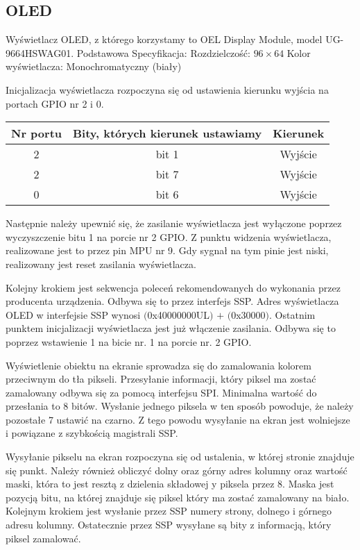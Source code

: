 \documentclass{classrep}
\begin{document}
		\subsection{OLED}
		Wyświetlacz OLED, z którego korzystamy to OEL Display Module, model UG-9664HSWAG01. 
		Podstawowa Specyfikacja:
		\newline \textendash Rozdzielczość:  $96\times 64$
		\newline \textendash Kolor wyświetlacza: Monochromatyczny (biały)
		
		Inicjalizacja wyświetlacza rozpoczyna się od ustawienia kierunku wyjścia na portach GPIO nr 2 i 0.
		
		
		 \begin{tabular}{|c|c|c|}
		 	\hline 
		 	\textbf{Nr portu} & \textbf{Bity, których kierunek ustawiamy} & \textbf{Kierunek}  \\ 
		 	\hline 
		 	2 & bit 1 & Wyjście \\ 
		 	\hline 
		 	2 & bit 7 & Wyjście  \\ 
		 	\hline 
		 	0 & bit 6 & Wyjście \\
		 	\hline
		 	 \end{tabular} 
		 	
		 	Następnie należy upewnić się, że zasilanie wyświetlacza jest wyłączone poprzez wyczyszczenie bitu 1 na porcie nr 2 GPIO. Z punktu widzenia wyświetlacza, realizowane jest to przez pin MPU nr 9. Gdy sygnał na tym pinie jest niski, realizowany jest reset zasilania wyświetlacza. \cite{SAS1-6020-A}
		 	
		 	Kolejny krokiem jest sekwencja poleceń rekomendowanych do wykonania przez producenta urządzenia. Odbywa się to przez interfejs SSP. Adres wyświetlacza OLED w interfejsie SSP wynosi $($0x40000000UL$)$ $+$  $($0x30000$)$.
		 	Ostatnim punktem inicjalizacji wyświetlacza jest już włączenie zasilania. Odbywa się to poprzez wstawienie 1 na bicie nr. 1 na porcie nr. 2 GPIO.
		 	
		 	
		 	Wyświetlenie obiektu na ekranie sprowadza się do zamalowania kolorem przeciwnym do tła pikseli. Przesyłanie informacji, który piksel ma zostać zamalowany odbywa się za pomocą interfejsu SPI. Minimalna wartość do przesłania to 8 bitów. Wysłanie jednego piksela w ten sposób powoduje, że należy pozostałe 7 ustawić na czarno. Z tego powodu wysyłanie na ekran jest wolniejsze i powiązane z szybkością magistrali SSP.
		 	
		 	Wysyłanie pikselu na ekran rozpoczyna się od ustalenia, w której stronie znajduje się punkt. Należy również obliczyć dolny oraz górny adres kolumny oraz wartość maski, która to jest resztą z dzielenia składowej y piksela przez 8. Maska jest pozycją bitu, na której znajduje się piksel który ma zostać zamalowany na biało. Kolejnym krokiem jest wysłanie przez SSP numery strony, dolnego i górnego adresu kolumny. Ostatecznie przez SSP wysyłane są bity z informacją, który piksel zamalować. 
		 	
\end{document}
